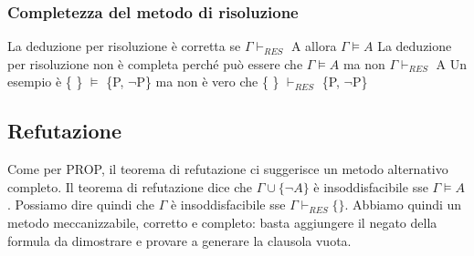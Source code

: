 \documentclass{article}
\begin{document}
\subsubsection{Completezza del metodo di risoluzione}
La deduzione per risoluzione è corretta	se $\Gamma \vdash _{RES}$ A allora $\Gamma \models A$ \newline
La deduzione per risoluzione non è completa perché può essere che $\Gamma \models A$ ma non $\Gamma \vdash _{RES}$ A \newline
Un esempio è \{ \} $\models$ \{P, $\neg$P\} ma non è vero che \{ \} $\vdash _{RES}$ \{P, $\neg$P\}

\subsection{Refutazione}
Come per PROP, il teorema di refutazione ci suggerisce un metodo alternativo completo. 
Il teorema di refutazione dice che $\Gamma \cup \{\neg A\}$ è insoddisfacibile sse $\Gamma \models A$. \newline
Possiamo dire quindi che $\Gamma$ è insoddisfacibile sse $\Gamma \vdash _{RES} \{\}$. Abbiamo quindi un metodo meccanizzabile, corretto e completo: basta aggiungere il negato della formula da dimostrare e provare a generare la clausola vuota.
\end{document}
